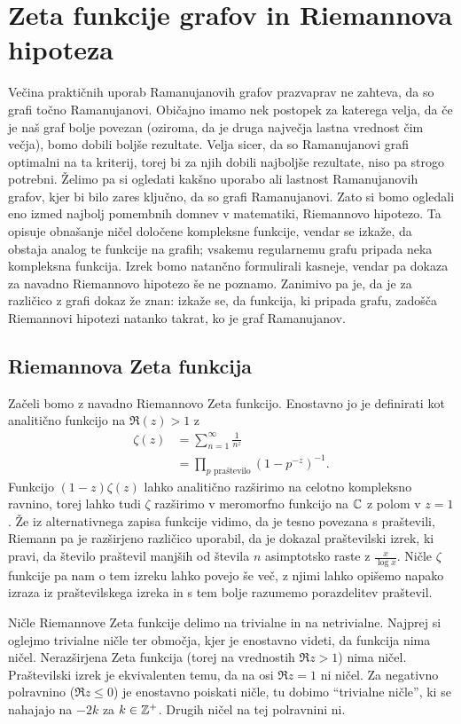 \section{Zeta funkcije grafov in Riemannova hipoteza}
Večina praktičnih uporab Ramanujanovih grafov prazvaprav ne zahteva, da so grafi točno Ramanujanovi. Običajno imamo nek postopek za katerega velja, da če je naš graf bolje povezan (oziroma, da je druga največja lastna vrednost čim večja), bomo dobili boljše rezultate. Velja sicer, da so Ramanujanovi grafi optimalni na ta kriterij, torej bi za njih dobili najboljše rezultate, niso pa strogo potrebni. Želimo pa si ogledati kakšno uporabo ali lastnost Ramanujanovih grafov, kjer bi bilo zares ključno, da so grafi Ramanujanovi. Zato si bomo ogledali eno izmed najbolj pomembnih domnev v matematiki, Riemannovo hipotezo. Ta opisuje obnašanje ničel določene kompleksne funkcije, vendar se izkaže, da obstaja analog te funkcije na grafih; vsakemu regularnemu grafu pripada neka kompleksna funkcija. Izrek bomo natančno formulirali kasneje, vendar pa dokaza za navadno Riemannovo hipotezo še ne poznamo. Zanimivo pa je, da je za različico z grafi dokaz že znan: izkaže se, da funkcija, ki pripada grafu, zadošča Riemannovi hipotezi natanko takrat, ko je graf Ramanujanov\cite{portablesnowbird}.

\subsection{Riemannova Zeta funkcija}
Začeli bomo z navadno Riemannovo Zeta funkcijo\cite{freitag1}. Enostavno jo je definirati kot analitično funkcijo na \(\Re(z)>1\) z
\begin{align*}
    \zeta(z) &= \sum_{n=1}^\infty \frac{1}{n^z} \\ 
    &= \prod_{p \text{ praštevilo}} \left(1-p^{-z}\right)^{-1}.
\end{align*}
Funkcijo \((1-z)\zeta(z)\) lahko analitično razširimo na celotno kompleksno ravnino, torej lahko tudi \(\zeta\) razširimo v meromorfno funkcijo na \(\mathbb C\) z polom v \(z=1\). Že iz alternativnega zapisa funkcije vidimo, da je tesno povezana s praštevili, Riemann pa je razširjeno različico uporabil, da je dokazal praštevilski izrek, ki pravi, da število praštevil manjših od števila \(n\) asimptotsko raste z \(\frac{x}{\log{x}}\). Ničle \(\zeta\) funkcije pa nam o tem izreku lahko povejo še več, z njimi lahko opišemo napako izraza iz praštevilskega izreka in s tem bolje razumemo porazdelitev praštevil.

Ničle Riemannove Zeta funkcije delimo na trivialne in na netrivialne. Najprej si oglejmo trivialne ničle ter območja, kjer je enostavno videti, da funkcija nima ničel. Nerazširjena Zeta funkcija (torej na vrednostih \(\Re z > 1\)) nima ničel. Praštevilski izrek je ekvivalenten temu, da na osi \(\Re z = 1\) ni ničel\cite{harolddiamond}. Za negativno polravnino (\(\Re z \leq 0\)) je enostavno poiskati ničle, tu dobimo ``trivialne ničle'', ki se nahajajo na \(-2k\) za \(k\in\mathbb Z^+\). Drugih ničel na tej polravnini ni.


